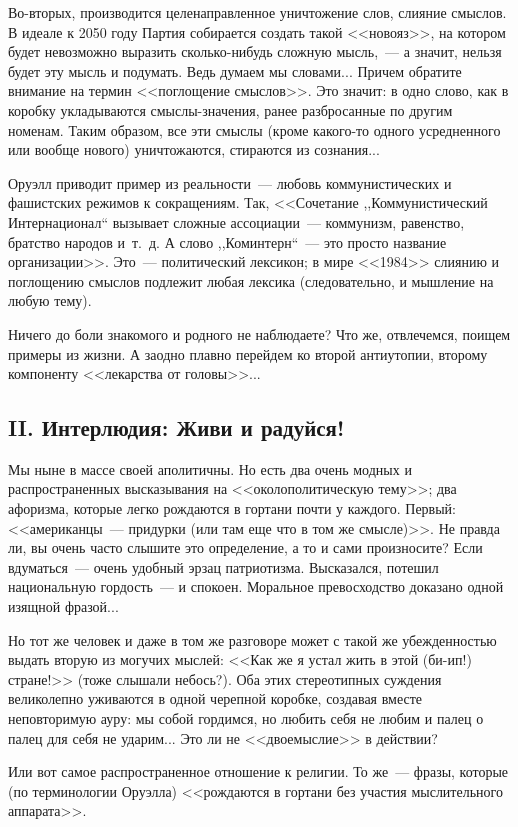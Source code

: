 \documentclass{scrbook}
\newcommand{\glqq}{,,}
\newcommand{\grqq}{``}
\newcommand{\flqq}{<<}
\newcommand{\frqq}{>>}
\newcommand{\mdash}{~--- }
\newcommand{\commamdash}{~--- } %
\newcommand{\essaysection}[1]{\subsection*{#1}\nopagebreak}
\begin{document}
Во-вторых, производится целенаправленное уничтожение слов, слияние смыслов. В идеале к 2050 году Партия собирается создать такой {\flqq}новояз{\frqq}, на котором будет невозможно выразить сколько-нибудь сложную мысль,{\commamdash}а значит, нельзя будет эту мысль и подумать. Ведь думаем мы словами... Причем обратите внимание на термин {\flqq}поглощение смыслов{\frqq}. Это значит: в одно слово, как в коробку укладываются смыслы-значения, ранее разбросанные по другим номенам. Таким образом, все эти смыслы (кроме какого-то одного усредненного или вообще нового) уничтожаются, стираются из сознания...

Оруэлл приводит пример из реальности{\mdash}любовь коммунистических и фашистских режимов к сокращениям. Так, {\flqq}Сочетание {\glqq}Коммунистический Интернационал{\grqq} вызывает сложные ассоциации{\mdash}коммунизм, равенство, братство народов и~т.~д. А слово {\glqq}Коминтерн{\grqq}{\mdash}это просто название организации{\frqq}. Это{\mdash}политический лексикон; в мире {\flqq}1984{\frqq} слиянию и поглощению смыслов подлежит любая лексика (следовательно, и мышление на любую тему).
 
Ничего до боли знакомого и родного не наблюдаете? Что же, отвлечемся, поищем примеры из жизни. А заодно плавно перейдем ко второй антиутопии, второму компоненту {\flqq}лекарства от головы{\frqq}... 
       
\essaysection{II. Интерлюдия: Живи и радуйся!} 
       
Мы ныне в массе своей аполитичны. Но есть два очень модных и распространенных высказывания на {\flqq}околополитическую тему{\frqq}; два афоризма, которые легко рождаются в гортани почти у каждого. Первый: {\flqq}американцы{\mdash}придурки (или там еще что в том же смысле){\frqq}. Не правда ли, вы очень часто слышите это определение, а то и сами произносите? Если вдуматься{\mdash}очень удобный эрзац патриотизма. Высказался, потешил национальную гордость{\mdash}и спокоен. Моральное превосходство доказано одной изящной фразой...

Но тот же человек и даже в том же разговоре может с такой же убежденностью выдать вторую из могучих мыслей: {\flqq}Как же я устал жить в этой (би-ип!) стране!{\frqq} (тоже слышали небось?). Оба этих стереотипных суждения великолепно уживаются в одной черепной коробке, создавая вместе неповторимую ауру: мы собой гордимся, но любить себя не любим и палец о палец для себя не ударим... Это ли не {\flqq}двоемыслие{\frqq} в действии?

Или вот самое распространенное отношение к религии. То же{\mdash}фразы, которые (по терминологии Оруэлла) {\flqq}рождаются в гортани без участия мыслительного аппарата{\frqq}.
 
\end{document}
